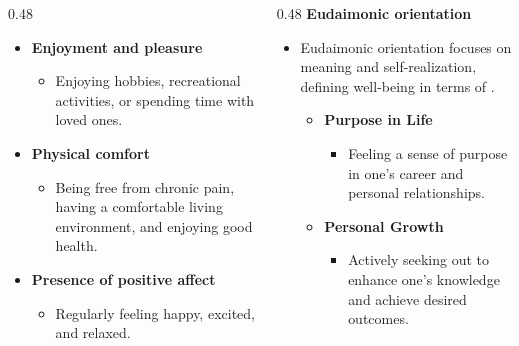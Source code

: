 \documentclass[
	aspectratio=169, %
	t, %
	onlytextwidth, %
	10pt, %
]{beamer}
\begin{document}
\begin{frame}
\begin{columns}[T]
\begin{column}{0.48\linewidth}
\begin{itemize}
				\begin{itemize}
					\item \textbf{Enjoyment and pleasure}
                        \begin{itemize}
                            \item Enjoying hobbies, recreational activities, or spending time with loved ones.
                        \end{itemize}
                        \item \textbf{Physical comfort}
                        \begin{itemize}
                            \item Being free from chronic pain, having a comfortable living environment, and enjoying good health.
                        \end{itemize}
                        \item \textbf{Presence of positive affect}
                        \begin{itemize}
                            \item Regularly feeling happy, excited, and relaxed.
                        \end{itemize}
				\end{itemize}
			\end{itemize}
		\end{column}
            \pause
		\begin{column}{0.48\linewidth} %
			\textbf{Eudaimonic orientation}\\
			\begin{itemize}
				\item Eudaimonic orientation focuses on meaning and self-realization, defining well-being in terms of . 
				\begin{itemize}
					\item \textbf{Purpose in Life}
					\begin{itemize}
						\item Feeling a sense of purpose in one's career and personal relationships.
					\end{itemize}
                        \item  \textbf{Personal Growth}
                        \begin{itemize}
                            \item Actively seeking out to enhance one's knowledge and achieve desired outcomes.
                        \end{itemize}

\end{itemize}
\end{itemize}
\end{column}
\end{columns}
\end{frame}
\end{document}
